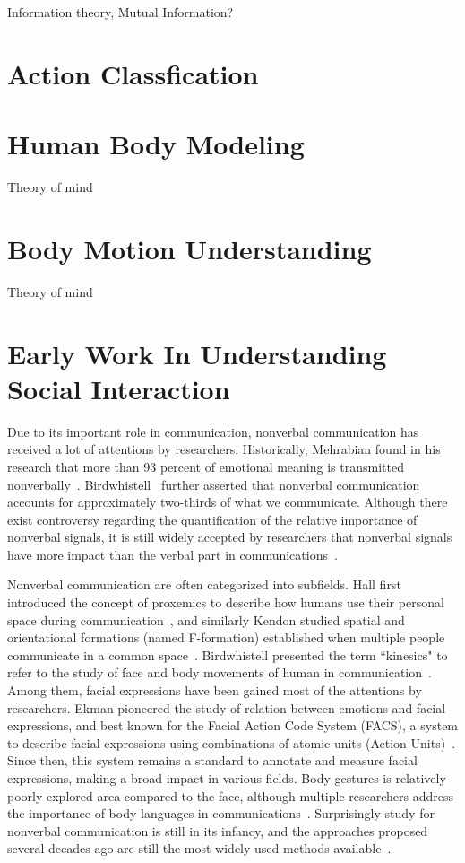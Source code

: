 Information theory, Mutual Information?

\section{Action Classfication}


\section{Human Body Modeling}
Theory of mind



\section{Body Motion Understanding}
Theory of mind


\section{Early Work In Understanding Social Interaction}

Due to its important role in communication, nonverbal communication has received a lot of attentions by researchers. Historically, Mehrabian found in his research that more than 93 percent of emotional meaning is transmitted nonverbally~\cite{Mehrabian67,Mehrabian81}. Birdwhistell~\cite{Birdwhistell70} further asserted that nonverbal communication accounts for approximately two-thirds of what we communicate. Although there exist controversy regarding the quantification of the relative importance of nonverbal signals, it is still widely accepted by researchers that nonverbal signals have more impact than the verbal part in communications~\cite{Moore13}.

Nonverbal communication are often categorized into subfields. Hall first introduced the concept of proxemics to describe how humans use their personal space during communication~\cite{Hall66}, and similarly Kendon studied spatial and orientational formations (named F-formation) established when multiple people communicate in a common space~\cite{kendon90}. Birdwhistell presented the term ``kinesics" to refer to the study of face and body movements of human in communication~\cite{Birdwhistell52, ekman1969}. Among them, facial expressions have been gained most of the attentions by researchers. Ekman pioneered the study of relation between emotions and facial expressions, and best known for the Facial Action Code System (FACS), a system to describe facial expressions using combinations of atomic units (Action Units)~\cite{ekman1977facial}. Since then, this system remains a standard to annotate and measure facial expressions, making a broad impact in various fields. Body gestures is relatively poorly explored area compared to the face, although multiple researchers address the importance of body languages in communications~\cite{Gelder09, Moore13, Meeren-2005, Aviezer-2012}. Surprisingly study for nonverbal communication is still in its infancy, and the approaches proposed several decades ago are still the most widely used methods available~\cite{Moore13}. 

